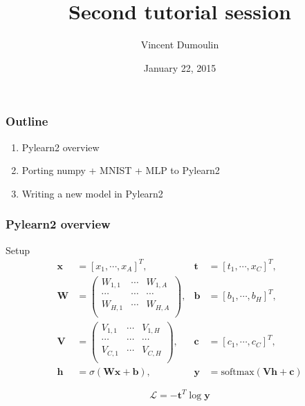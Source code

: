 \documentclass[mathserif, xcolor=dvipsnames]{beamer}
\title{Second tutorial session}
\author{Vincent Dumoulin}
\date{January 22, 2015}
\begin{document}
\begin{frame}[plain]
    \titlepage
\end{frame}

\begin{frame}
    \frametitle{Outline}
    \begin{enumerate}\addtolength{\itemsep}{1.5\baselineskip}
        \item{Pylearn2 overview}
        \item{Porting numpy + MNIST + MLP to Pylearn2}
        \item{Writing a new model in Pylearn2}
    \end{enumerate}
\end{frame}

\begin{frame}
    \frametitle{Pylearn2 overview}

    \begin{block}{Setup}
    \begin{align*}
        \mathbf{x} &= [x_1, \cdots, x_A]^T,
        &\mathbf{t} &= [t_1, \cdots, x_C]^T, \\
        \mathbf{W} &= \begin{pmatrix}
            W_{1,1} & \cdots & W_{1,A} \\
            \cdots  & \cdots & \cdots  \\
            W_{H,1} & \cdots & W_{H,A} \\
        \end{pmatrix},
        &\mathbf{b} &= [b_1, \cdots, b_H]^T, \\
        \mathbf{V} &= \begin{pmatrix}
            V_{1,1} & \cdots & V_{1,H} \\
            \cdots  & \cdots & \cdots  \\
            V_{C,1} & \cdots & V_{C,H} \\
        \end{pmatrix},
        &\mathbf{c} &= [c_1, \cdots, c_C]^T, \\
        \mathbf{h} &= \sigma(\mathbf{W}\mathbf{x} + \mathbf{b}),
        &\mathbf{y} &= \textrm{softmax}(\mathbf{V}\mathbf{h} + \mathbf{c})
    \end{align*}

    \begin{equation*}
        \mathcal{L} = -\mathbf{t}^T \log \mathbf{y}
    \end{equation*}
    \end{block}
\end{frame}
\end{document}
